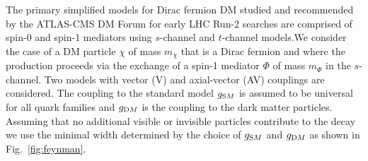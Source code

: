 







The primary simplified models for Dirac fermion DM studied and recommended by
the ATLAS-CMS DM Forum for early LHC Run-2 searches are comprised of spin-0 and
spin-1 mediators using $s$-channel and $t$-channel models.We consider the case
of a DM particle $\chi$ of mass $m_{\chi}$ that is a Dirac fermion and where the
production proceeds via the exchange of a spin-1 mediator $\Phi$ of mass
$m_{\Phi}$ in the $s$-channel. Two models with vector (V) and axial-vector (AV)
couplings are considered. The coupling to the standard model $g_{\textrm SM}$ is
assumed to be universal for all quark families and $g_{\textrm DM}$ is the
coupling to the dark matter particles. Assuming that no additional visible or
invisible particles contribute to the decay we use the minimal width determined
by the choice of $g_{\textrm SM}$ and $g_{\textrm DM}$ as shown in
Fig.~\ref{fig:feynman}.

